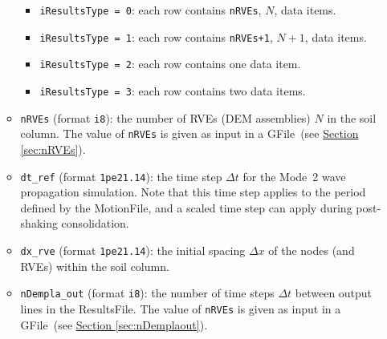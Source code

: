 \documentclass[letterpaper,11pt]{article}
\newcommand{\GFile}{\textsf{GFile}}
\newcommand{\MotionFile}{\textsf{MotionFile}}
\newcommand{\ResultsFile}{\textsf{ResultsFile}}
\begin{document}
\begin{itemize}
\begin{itemize}
\begin{itemize}
        \item
          \texttt{iResultsType = 0}:
          each row contains \texttt{nRVEs}, $N$,
          data items.
       \item
         \texttt{iResultsType = 1}:
         each row contains \texttt{nRVEs+1}, $N+1$,
         data items.
       \item
          \texttt{iResultsType = 2}:
          each row contains one data item.
        \item
          \texttt{iResultsType = 3}:
          each row contains two data items.
      \end{itemize}
    \item
      \texttt{nRVEs} (format \texttt{i8}): 
      the number of RVEs (DEM assemblies) $N$ in the soil column.
      The value of \texttt{nRVEs} is given as input in
      a \GFile\ (see
      \hyperref[sec:nRVEs]{Section \ref*{sec:nRVEs}}).
    \item
      \texttt{dt\_ref} (format \texttt{1pe21.14}): 
      the time step $\Delta t$ for the Mode~2
      wave propagation simulation.
      Note that this time step applies to the period defined
      by the \MotionFile , and a scaled time step can apply during
      post-shaking consolidation.
    \item
      \texttt{dx\_rve} (format \texttt{1pe21.14}):
      the initial spacing $\Delta x$ of the
      nodes (and RVEs) within the soil column.
    \item
      \texttt{nDempla\_out} (format \texttt{i8}):
      the number of time steps $\Delta t$
      between output lines in the \ResultsFile .
      The value of \texttt{nRVEs} is given as input in
      a \GFile\ (see
      \hyperref[sec:nDemplaout]{Section \ref*{sec:nDemplaout}}).
  \end{itemize}
%
\end{itemize}
%
%
\end{document}
